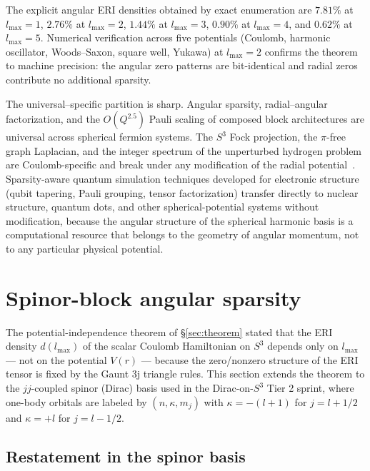\documentclass[twocolumn,pra,amsmath,amssymb,superscriptaddress]{revtex4-2}
\begin{document}
The explicit angular ERI densities obtained by exact enumeration are
$7.81\%$ at $l_{\max}=1$, $2.76\%$ at $l_{\max}=2$, $1.44\%$ at
$l_{\max}=3$, $0.90\%$ at $l_{\max}=4$, and $0.62\%$ at $l_{\max}=5$.
Numerical verification across five potentials (Coulomb, harmonic
oscillator, Woods--Saxon, square well, Yukawa) at $l_{\max}=2$
confirms the theorem to machine precision: the angular zero patterns
are bit-identical and radial zeros contribute no additional
sparsity.

The universal--specific partition is sharp.  Angular sparsity,
radial--angular factorization, and the $O(Q^{2.5})$ Pauli scaling of
composed block architectures are universal across spherical fermion
systems.  The $S^3$ Fock projection, the $\pi$-free graph Laplacian,
and the integer spectrum of the unperturbed hydrogen problem are
Coulomb-specific and break under any modification of the radial
potential~\cite{GeoVac_Paper23}.  Sparsity-aware quantum simulation
techniques developed for electronic structure (qubit tapering, Pauli
grouping, tensor factorization) transfer directly to nuclear
structure, quantum dots, and other spherical-potential systems
without modification, because the angular structure of the
spherical harmonic basis is a computational resource that belongs
to the geometry of angular momentum, not to any particular physical
potential.


\section{Spinor-block angular sparsity}
\label{sec:paper22_spinor}

The potential-independence theorem of \S\ref{sec:theorem} stated that
the ERI density $d(l_{\max})$ of the scalar Coulomb Hamiltonian on
$S^3$ depends only on $l_{\max}$ --- not on the potential $V(r)$ ---
because the zero/nonzero structure of the ERI tensor is fixed by the
Gaunt 3j triangle rules. This section extends the theorem to the
$jj$-coupled spinor (Dirac) basis used in the Dirac-on-$S^3$ Tier 2
sprint, where one-body orbitals are labeled by $(n, \kappa, m_j)$ with
$\kappa = -(l+1)$ for $j = l + 1/2$ and $\kappa = +l$ for $j = l - 1/2$.

\subsection{Restatement in the spinor basis}
\end{document}
